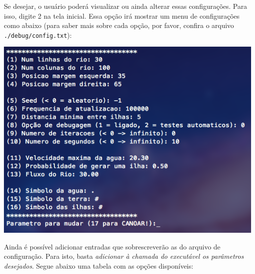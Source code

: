 \documentclass[11pt,a4paper]{article}
\begin{document}
Se desejar, o usuário poderá visualizar ou ainda alterar essas configurações. Para isso, digite 2 na tela inicial. Essa opção irá mostrar um menu de configurações como abaixo (para saber mais sobre cada opção, por favor, confira o arquivo \verb|./debug/config.txt|):\\
\begin{center}
\includegraphics[scale=0.6]{config.png}
\end{center}
\vspace{0.5cm}
Ainda é possível adicionar entradas que sobrescreverão as do arquivo de configuração. Para isto, basta \textit{adicionar à chamada do executável os parâmetros desejados}. Segue abaixo uma tabela com as opções disponíveis: \\
\end{document}
